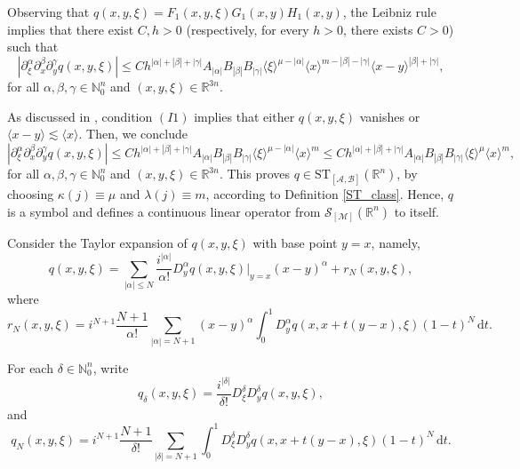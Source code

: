 \documentclass[11pt,reqno]{amsart}
\numberwithin{equation}{section}
\newcommand{\ST}{{\mathrm{ST}}}
\newcommand{\M}{{\mathcal{M}}} %
\newcommand{\A}{{\mathcal{A}}} %
\newcommand{\B}{{\mathcal{B}}} %
\begin{document}
Observing that $q(x,y,\xi)=F_1(x,y,\xi)G_1(x,y)H_1(x,y)$, the Leibniz rule implies that there exist $C,h>0$ (respectively, for every $h>0$, there exists $C>0$) such that
%
\begin{equation*}
	|\partial_\xi^\alpha\partial_x^\beta\partial_y^\gamma q(x,y,\xi)| \leq Ch^{|\alpha|+|\beta|+|\gamma|} A_{|\alpha|}B_{|\beta|}B_{|\gamma|} \langle\xi\rangle^{\mu-|\alpha|} \langle x\rangle^{m-|\beta|-|\gamma|}\langle x-y\rangle^{|\beta|+|\gamma|},
\end{equation*}
%
for all $\alpha,\beta,\gamma\in\mathbb{N}_0^n$ and $(x,y,\xi)\in\mathbb{R}^{3n}$.

As discussed in \cite[Remark 2.11]{Schrohe86}, condition $(I1)$ implies that either $q(x,y,\xi)$ vanishes or $\langle x-y\rangle\lesssim \langle x\rangle$. 
Then, we conclude
%
\begin{equation*}
	|\partial_\xi^\alpha\partial_x^\beta\partial_y^\gamma q(x,y,\xi)| 
	\leq 
	Ch^{|\alpha|+|\beta|+|\gamma|} A_{|\alpha|} B_{|\beta|} B_{|\gamma|} \langle \xi \rangle^{\mu-|\alpha|} \langle x \rangle^{m}
	\leq 
	Ch^{|\alpha|+|\beta|+|\gamma|} A_{|\alpha|} B_{|\beta|} B_{|\gamma|} \langle \xi \rangle^{\mu} \langle x \rangle^{m},
\end{equation*}
%
for all $\alpha,\beta,\gamma\in\mathbb{N}_0^n$ and $(x,y,\xi)\in\mathbb{R}^{3n}$. This proves $q\in \ST_{[\A,\B]}(\mathbb{R}^n)$, by choosing 
$\kappa(j)\equiv \mu$ and $\lambda(j)\equiv m$, according to Definition \ref{ST_class}. Hence, $q$ is a symbol and defines a continuous linear 
operator from $\mathcal{S}_{[\M]}(\mathbb{R}^n)$ to itself.


Consider the Taylor expansion of $q(x,y,\xi)$ with base point $y=x$, namely,
%
\begin{equation}\label{taylor}
	q(x,y,\xi) = \sum_{|\alpha|\leq N}\frac{i^{|\alpha|}}{\alpha!}D_y^\alpha q(x,y,\xi)|_{y=x}(x-y)^\alpha + r_N(x,y,\xi),
\end{equation}
%
where
%
\begin{equation*}
	r_N(x,y,\xi) = i^{N+1}\frac{N+1}{\alpha!}\sum_{|\alpha|=N+1}(x-y)^\alpha\int_0^1 D_y^\alpha q(x,x+t(y-x),\xi)(1-t)^N\,\mathrm{d}t.
\end{equation*}

For each $\delta\in\mathbb{N}_0^n$, write
%
\begin{equation*}
	q_\delta(x,y,\xi) = \frac{i^{|\delta|}}{\delta!}D_\xi^\delta D_y^\delta q(x,y,\xi),
\end{equation*}
%
and
%
\begin{equation*}
	q_N(x,y,\xi)=i^{N+1}\frac{N+1}{\delta!}\sum_{|\delta|=N+1}\int_0^1 D_\xi^\delta D_y^\delta q(x,x+t(y-x),\xi)(1-t)^N\,\mathrm{d}t.
\end{equation*}
\end{document}
